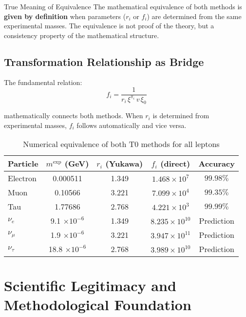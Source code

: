\documentclass[12pt,a4paper]{article}
\begin{document}
	\begin{key}{True Meaning of Equivalence}{}
		The mathematical equivalence of both methods is \textbf{given by definition} when parameters ($r_i$ or $f_i$) are determined from the same experimental masses. The equivalence is not proof of the theory, but a consistency property of the mathematical structure.
	\end{key}
	
	\subsection{Transformation Relationship as Bridge}
	\label{subsec:transformation_relationship}
	
	The fundamental relation:
	\begin{equation}
		f_i = \frac{1}{r_i \, \xi^{\pi_i} \, v \, \xi_0}
		\label{eq:transformation_bridge}
	\end{equation}
	
	mathematically connects both methods. When $r_i$ is determined from experimental masses, $f_i$ follows automatically and vice versa.
	
	\begin{table}[H]
		\centering
		\begin{tabular}{lcccc}
			\toprule
			\textbf{Particle} & \textbf{$m^{\text{exp}}$ (GeV)} & \textbf{$r_i$ (Yukawa)} & \textbf{$f_i$ (direct)} & \textbf{Accuracy} \\
			\midrule
			Electron & 0.000511 & 1.349 & $1.468 \times 10^{7}$ & $99.98\%$ \\
			Muon & 0.10566 & 3.221 & $7.099 \times 10^{4}$ & $99.35\%$ \\
			Tau & 1.77686 & 2.768 & $4.221 \times 10^{3}$ & $99.99\%$ \\
			\midrule
			$\nu_e$ & 9.1 $\times 10^{-6}$ & 1.349 & $8.235 \times 10^{10}$ & Prediction \\
			$\nu_\mu$ & 1.9 $\times 10^{-6}$ & 3.221 & $3.947 \times 10^{11}$ & Prediction \\
			$\nu_\tau$ & 18.8 $\times 10^{-6}$ & 2.768 & $3.989 \times 10^{10}$ & Prediction \\
			\bottomrule
		\end{tabular}
		\caption{Numerical equivalence of both T0 methods for all leptons}
		\label{tab:numerical_equivalence_complete}
	\end{table}
	
	\section{Scientific Legitimacy and Methodological Foundation}
	\label{sec:scientific_legitimacy}
	
\end{document}
